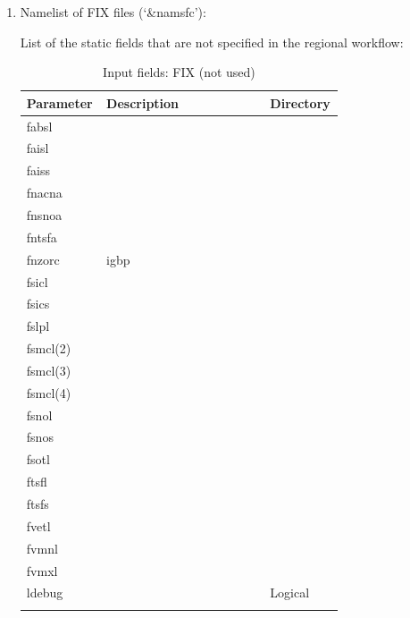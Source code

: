 \documentclass[11pt,fleqn]{report}              %
\begin{document}
\begin{enumerate}
\item Namelist of FIX files (`\&namsfc'):

List of the static fields that are not specified in the regional workflow: 
{
\scriptsize
\begin{longtable}{p{0.12\linewidth} | p{0.5\linewidth} | p{0.12\linewidth} }
\hline
\hline
Parameter & Description & Directory \\
\hline
 fabsl & & \\
 faisl & & \\
 faiss & & \\
 fnacna & & \\
 fnsnoa & & \\
 fntsfa & & \\
 fnzorc & igbp &  \\
 fsicl & & \\
 fsics & & \\
 fslpl & & \\
 fsmcl(2) & & \\
 fsmcl(3) & & \\
 fsmcl(4) & & \\
 fsnol & & \\
 fsnos & & \\
 fsotl & & \\
 ftsfl & & \\
 ftsfs & & \\
 fvetl & & \\
 fvmnl & & \\
 fvmxl & & \\
 ldebug & & Logical \\
\hline
\caption{Input fields: FIX (not used)}
\label{table:fv3_input_nml_namsfc_na}
\end{longtable}
}



\end{enumerate}
\end{document}
